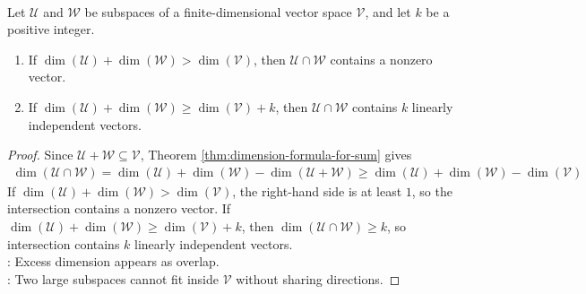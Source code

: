 \begin{corollary} \label{cor:large-subspaces-intersect} \\
Let $\mathcal{U}$ and $\mathcal{W}$ be subspaces of a finite-dimensional vector space $\mathcal{V}$, and let $k$ be a positive integer.
\begin{enumerate}[label=\roman*.]
\setlength{\itemsep}{0pt}
\item If $\dim(\mathcal{U})+\dim(\mathcal{W})>\dim(\mathcal{V})$, then $\mathcal{U}\cap\mathcal{W}$ contains a nonzero vector.
\item If $\dim(\mathcal{U})+\dim(\mathcal{W})\geq\dim(\mathcal{V})+k$, then $\mathcal{U}\cap\mathcal{W}$ contains $k$ linearly independent vectors.
\end{enumerate}
\begin{proof}
Since $\mathcal{U}+\mathcal{W}\subseteq\mathcal{V}$, Theorem \ref{thm:dimension-formula-for-sum} gives
\begin{align}
\dim(\mathcal{U}\cap\mathcal{W}) =\dim(\mathcal{U})+\dim(\mathcal{W})-\dim(\mathcal{U}+\mathcal{W}) \geq \dim(\mathcal{U})+\dim(\mathcal{W})-\dim(\mathcal{V}) \nonumber
\end{align}
If $\dim(\mathcal{U})+\dim(\mathcal{W})>\dim(\mathcal{V})$, the right-hand side is at least $1$, so the intersection contains a nonzero vector. If $\dim(\mathcal{U})+\dim(\mathcal{W})\geq\dim(\mathcal{V})+k$, then $\dim(\mathcal{U}\cap\mathcal{W})\geq k$, so intersection contains $k$ linearly independent vectors.\\
: Excess dimension appears as overlap.\\
: Two large subspaces cannot fit inside $\mathcal{V}$ without sharing directions.
\end{proof}
\end{corollary}

